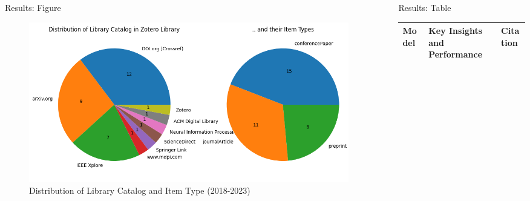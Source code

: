 \documentclass[xcolor={cmyk}]{beamer} %
\begin{document}
\begin{frame}[t]
\begin{columns}[t]
\begin{column}{0.3\textwidth}
			\begin{block}{Results: Figure}
				\setcounter{figure}{0}
				\begin{minipage}{\linewidth}
					\begin{figure}
						\includegraphics[width=\linewidth]{Figure_1.png}
						\caption{Distribution of Library Catalog and Item Type (2018-2023)}
					\end{figure}
				\end{minipage}
			\end{block}



		\end{column} %

		\begin{column}{0.005\textwidth}\end{column} %

		\begin{column}{0.3\textwidth}



			\begin{block}{Results: Table}
				\begin{footnotesize}
					\begin{table}[H]
						\begin{tabular}{p{} p{} p{}}
							\toprule
							Model                         & Key Insights and Performance                                                                                   & Citation                                           \\
							\midrule


\end{tabular}
\end{table}
\end{footnotesize}
\end{block}
\end{column}
\end{columns}
\end{frame}
\end{document}

